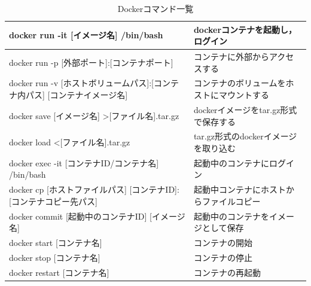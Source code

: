 \begin{table}[htb]
    \begin{center}
        \caption{Dockerコマンド一覧}
        \begin{tabularx}{\textwidth}{|l|X|}\hline
            docker run -it [イメージ名] /bin/bash & dockerコンテナを起動し，ログイン \\ \hline
            docker run -p [外部ポート]:[コンテナポート] & コンテナに外部からアクセスする \\ \hline
            docker run -v [ホストボリュームパス]:[コンテナ内パス] [コンテナイメージ名] & コンテナのボリュームをホストにマウントする \\ \hline
            docker save [イメージ名] \textgreater [ファイル名].tar.gz & dockerイメージをtar.gz形式で保存する\\ \hline
            docker load \textless [ファイル名].tar.gz & tar.gz形式のdockerイメージを取り込む \\ \hline
            docker exec -it [コンテナID/コンテナ名] /bin/bash & 起動中のコンテナにログイン \\ \hline
            docker cp [ホストファイルパス] [コンテナID]:[コンテナコピー先パス] & 起動中コンテナにホストからファイルコピー \\ \hline
            docker commit [起動中のコンテナID] [イメージ名] & 起動中のコンテナをイメージとして保存 \\ \hline
            docker start [コンテナ名] & コンテナの開始 \\ \hline
            docker stop [コンテナ名] & コンテナの停止 \\ \hline
            docker restart [コンテナ名] & コンテナの再起動 \\ \hline
        \end{tabularx}
        \label{docker_command}
    \end{center}
\end{table}


